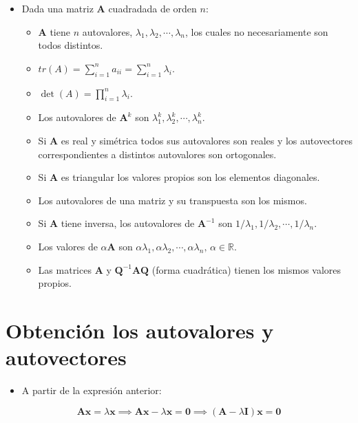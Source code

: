 \documentclass[openany]{book}
\providecommand{\tightlist}{%
  \setlength{\itemsep}{0pt}\setlength{\parskip}{0pt}}
\begin{document}
\begin{itemize}
\item
  Dada una matriz \(\textbf{A}\) cuadradada de orden \(n\):

  \begin{itemize}
  \tightlist
  \item
    \(\textbf{A}\) tiene \(n\) autovalores, \(\lambda_1, \lambda_2, \cdots, \lambda_n\), los cuales no necesariamente son todos distintos.
  \item
    \(tr(A) = \sum_{i=1}^n a_{ii} = \sum_{i=1}^n \lambda_{i}\).
  \item
    \(\det(A) = \prod_{i=1}^n \lambda_{i}\).
  \item
    Los autovalores de \(\textbf{A}^k\) son \(\lambda_1^k, \lambda_2^k, \cdots, \lambda_n^k\).
  \item
    Si \(\textbf{A}\) es real y simétrica todos sus autovalores son reales y los autovectores correspondientes a distintos autovalores son ortogonales.
  \item
    Si \(\textbf{A}\) es triangular los valores propios son los elementos diagonales.
  \item
    Los autovalores de una matriz y su transpuesta son los mismos.
  \item
    Si \(\textbf{A}\) tiene inversa, los autovalores de \(\textbf{A}^{-1}\) son \(1/\lambda_1, 1/\lambda_2, \cdots, 1/\lambda_n\).
  \item
    Los valores de \(\alpha \textbf{A}\) son \(\alpha \lambda_1, \alpha \lambda_2, \cdots, \alpha \lambda_n, \, \alpha \in \mathbb{R}\).
  \item
    Las matrices \(\textbf{A}\) y \(\textbf{Q}^{-1}\textbf{AQ}\) (forma cuadrática) tienen los mismos valores propios.
  \end{itemize}
\end{itemize}

\hypertarget{obtenciuxf3n-los-autovalores-y-autovectores}{%
\section{Obtención los autovalores y autovectores}\label{obtenciuxf3n-los-autovalores-y-autovectores}}

\begin{itemize}
\tightlist
\item
  A partir de la expresión anterior:
\end{itemize}

\[
\textbf{Ax} = \lambda \textbf{x} \implies \textbf{Ax} - \lambda \textbf{x} = \textbf{0} \implies (\textbf{A} - \lambda \textbf{I}) \textbf{x} = \textbf{0} 
\]
\end{document}
